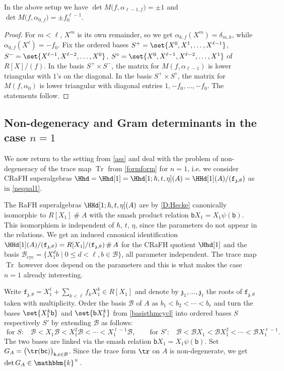 \documentclass[a4paper,11pt]{amsart}
\newcommand{\Tr}{\op{Tr}}
\newcommand\cB{\mathcal{B}}
\numberwithin{equation}{subsection}
\theoremstyle{definition}
\theoremstyle{theorem}
\theoremstyle{remark}
\newcommand\charge{{\mathfrak{z}}}
\newcommand\kapp{{\mathfrak{z}}}
\newcommand\fct{\mathtt{f}_{\charge,\theta}}
\newcommand\bb{\mathsf{b}}
\newcommand\bc{\mathsf{c}}
\newcommand\op{\operatorname}
\newcommand\kk{\mathbbm{k}}
\DeclareMathOperator\Smash{\#}
\begin{document}
\begin{Lemma}\label{L:hankel}
In the above setup we have $\det M\bigl(f,\alpha_{\ell-1,f}\bigr)=\pm1$ and $\det M\bigl(f,\alpha_{0,f}\bigr)=\pm f_0^{\,\ell-1}$.
\end{Lemma}

\begin{proof}For $m<\ell$,  $X^{m}$ is its own
  remainder, so we get  $\alpha_{k,f}(X^{m})=\delta_{m,k}$, while $\alpha_{0,f}(X^{\ell})=-f_0$. Fix the ordered bases  $S^+=\set{X^0, X^1,\ldots, X^{\ell-1}}$, $S^-=\set{X^{\ell-1}, X^{\ell-2},\ldots, X^0}$, $S^\diamond=\set{X^0,X^{\ell-1}, X^{\ell-2},\ldots,X^1}$ of $R[X]/(f)$.
    In the basis $S^+\times S^-$, the matrix for $M(f,\alpha_{\ell-1})$ is lower triangular  with $1$'s on the diagonal. In the basis $S^+\times S^\diamond$, the matrix for $M(f,\alpha_{0})$ is lower triangular with
  diagonal entries $1,-f_0,\dots,-f_0$. The statements follow.
\end{proof}

\subsection{Non-degeneracy and Gram determinants in the case $n=1$}\label{S:tracenequal1}
We now return to the setting from  \autoref{ass}  and  deal with the problem of non-degeneracy of the trace map $\Tr$ from  \autoref{formform}  for $n=1$, i.e. we consider CRaFH superalgebras $\Hhd=\Hhd[1]=\Hhd[1;\hbar, t, \eta](A)=\HHd[1](A)/(\fct)$  as in \autoref{nequal1}.


The RaFH superalgebras $\HHd[1;\hbar, t, \eta](A)$  are by \autoref{D:Hecke} canonically isomorphic to $R[X_1]\Smash A$ with the smash product relation $\bb X_1=X_1\psi(\bb)$. This isomorphism is  independent of $\hbar$, $t$, $\eta$, since the parameters do not  appear in the relations. We get  an induced canonical identification $\HHd[1](A)/(\fct)=R[X_1]/(\fct)\Smash A$ for the CRaFH quotient  $\Hhd[1]$ and the basis $\cB_{\op{cyc}}=\{X_1^d b\mid 0\leq d< \ell,  b\in\cB\}$, all parameter independent. The trace map $\Tr$ however does  depend on the parameters and this is what makes the case $n=1$ already interesting.


Write $\fct=X_1^{\ell}+\sum_{k<\ell}f_kX_1^{k}\in R[X_1]$ and  denote by $\kapp_1,\dots,\kapp_\ell$  the roots of $\fct$ taken with multiplicity.
Order the basis $\cB$ of $A$ as $b_1<b_2<\cdots<b_r$ and turn the bases $\set{X_1^{k}\bb}$ and $\set{\bb X_1^{k}}$ from \autoref{basisthmcycl}  into ordered bases $S$ respectively $S'$ by extending $\cB$ as follows:
\begin{equation}\label{SS}
\text{ for $S$:}\quad \cB<X_1\cB<X_1^{2}\cB<\cdots<X_1^{\ell-1}\cB,\quad\quad\text{for $S'$:}\quad \cB<\cB X_1<\cB X_1^{2}<\cdots<\cB X_1^{\ell-1}.
\end{equation}
The two bases are linked via the smash  relation $\bb X_1=X_1\psi(\bb)$.
Set $G_A=\bigl(\tr(\bb\bc)\bigr)_{\bb,\bc\in\cB}$. Since the trace form $\tr$ on $A$ is non-degenerate, we get $\det G_A\in\kk^{\times}$.
\end{document}
